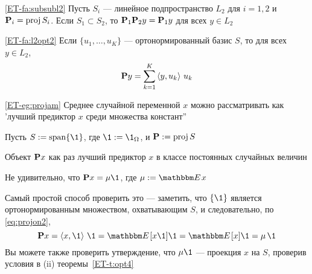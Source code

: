 \begin{frame}

    \vspace{2em}
    \Fact\eqref{ET-fa:subsubl2}
    Пусть $S_i$ --- линейное подпространство $L_2$ для $i=1,2$ и $\mathbf P_i =
    \operatorname{proj} S_i$. Если $S_1 \subset S_2$, то
        $\mathbf P_1 \mathbf P_2 y = \mathbf P_1 y$ для всех $y \in L_2$
        
    \vspace{1em}
    \Fact\eqref{ET-fa:l2opt2}
    Если $\{u_1, \ldots, u_K\}$ --- ортонормированный базис $S$, то для всех $y
    \in L_2$,
    \begin{equation}
        \label{eq:projon2}
        \mathbf P y = \sum_{k=1}^K \left\langle{y, u_k}\right\rangle \, u_k
    \end{equation}
    
\end{frame}

\begin{frame}

    \vspace{2em}
    \Eg
    \eqref{ET-eg:projam}
    Среднее случайной переменной $x$ можно рассматривать как 
    'лучший предиктор $x$ среди множества констант''  
    
    Пусть $S := \Span\{\1\}$, где $\1 := \1_\Omega$,
    и $\mathbf P := \operatorname{proj} S$
    
    Объект $\mathbf P x$ как раз лучший предиктор
    $x$ в классе постоянных случайных величин
    
   Не удивительно, что $\boldP x = \mu \1$, где $\mu := \EE x$
    
    Самый простой способ проверить это --- заметить, что $\{\1\}$ является
    ортонормированным множеством, охватывающим $S$, и следовательно, по \eqref{eq:projon2},
    \begin{equation*}
        \boldP x 
        = \inner{x, \1} \, \1
        = \EE[x \1] \1 = \EE[x] \1 = \mu \, \1
    \end{equation*}
    Вы можете также проверить утверждение, что $\mu \1$ --- проекция $x$ на
    $S$, проверив условия в (ii) теоремы~\ref{ET-t:opt4}
    

\end{frame}

